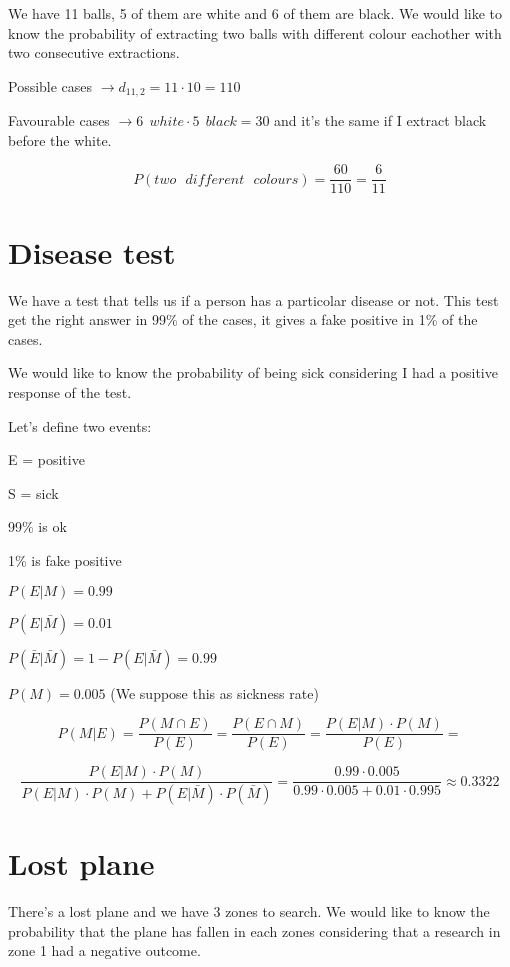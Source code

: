 \documentclass{article}
\begin{document}
We have 11 balls, 5 of them are white and 6 of them are black. We would like to know the probability of extracting two balls with different colour eachother with two consecutive extractions.

\bigskip

Possible cases $\rightarrow d_{11,2} = 11 \cdot 10 = 110$

Favourable cases $\rightarrow 6 \ \ white \cdot 5 \ \ black = 30$ and it's the same if I extract black before the white.

\bigskip

$$P(two \ \ \ different \ \ \ colours) = \frac{60}{110} = \frac{6}{11}$$

\section{Disease test}

We have a test that tells us if a person has a particolar disease or not. This test get the right answer in 99\% of the cases, it gives a fake positive in 1\% of the cases.

We would like to know the probability of being sick considering I had a positive response of the test.

\bigskip

Let's define two events: 

E = positive

S = sick

\bigskip

99\% is ok

1\% is fake positive

\bigskip

$P(E|M) = 0.99$

$P(E|\bar M) = 0.01$

$P(\bar E| \bar M) = 1 - P(E | \bar M) = 0.99$

$P(M) = 0.005$ (We suppose this as sickness rate)


$$P(M|E) = \frac{P(M \cap E)}{P(E)} = \frac{P(E\cap M)}{P(E)} = \frac{P(E|M)\cdot P(M)}{P(E)} = $$

$$\frac{P(E|M)\cdot P(M)}{P(E|M) \cdot P(M) + P(E|\bar M) \cdot P(\bar M)} = \frac{0.99 \cdot 0.005}{0.99 \cdot 0.005 + 0.01 \cdot 0.995} \approx 0.3322$$

\section{Lost plane}

There's a lost plane and we have 3 zones to search.
We would like to know the probability that the plane has fallen in each zones considering that a research in zone 1 had a negative outcome.
\end{document}
